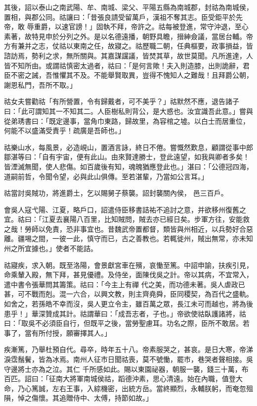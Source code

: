 \begin{pinyinscope}
 其後，詔以泰山之南武陽、牟、南城、梁父、平陽五縣為南城郡，封祜為南城侯，置相，與郡公同。祜讓曰：「昔張良請受留萬戶，漢祖不奪其志。臣受鉅平於先帝，敢
 辱重爵，以速官謗！」固執不拜，帝許之。祜每被登進，常守沖退，至心素著，故特見申於分列之外。是以名德遠播，朝野具瞻，搢紳僉議，當居台輔。帝方有兼并之志，仗祜以東南之任，故寢之。祜歷職二朝，任典樞要，政事損益，皆諮訪焉，勢利之求，無所關與。其嘉謀讜議，皆焚其草，故世莫聞。凡所進達，人皆不知所由。或謂祜慎密太過者，祜曰：「是何言歟！夫入則造膝，出則詭辭，君臣不密之誡，吾惟懼其不及。不能舉賢取異，豈得不愧知人之難哉！且拜爵公朝，謝恩私門，吾所不取。」



 祜女夫嘗勸祜「有所營置，令有歸戴者，可不美乎？」祜默然不應，退告諸子
 曰：「此可謂知其一不知其二。人臣樹私則背公，是大惑也。汝宜識吾此意。」嘗與從弟琇書曰：「既定邊事，當角巾東路，歸故里，為容棺之墟。以白士而居重位，何能不以盛滿受責乎！疏廣是吾師也。」



 祜樂山水，每風景，必造峴山，置酒言詠，終日不倦。嘗慨然歎息，顧謂從事中郎鄒湛等曰：「自有宇宙，便有此山。由來賢達勝士，登此遠望，如我與卿者多矣！皆湮滅無聞，使人悲傷。如百歲後有知，魂魄猶應登此也。」湛曰：「公德冠四海，道嗣前哲，令聞令望，必與此山俱傳。至若湛輩，乃當如公言耳。」



 祜當討吳賊功，將進爵土，乞以賜舅子蔡襲。詔封襲關內侯，
 邑三百戶。



 會吳人寇弋陽、江夏，略戶口，詔遣侍臣移書詰祐不追討之意，并欲移州復舊之宜。祜曰：「江夏去襄陽八百里，比知賊問，賊去亦已經日矣。步軍方往，安能救之哉！勞師以免責，恐非事宜也。昔魏武帝置都督，類皆與州相近，以兵勢好合惡離。疆埸之間，一彼一此，慎守而已，古之善教也。若輒徙州，賊出無常，亦未知州之所宜據也。」使者不能詰。



 祜寢疾，求入朝。既至洛陽，會景獻宮車在殯，哀慟至篤。中詔申諭，扶疾引見，命乘輦入殿，無下拜，甚見優禮。及侍坐，面陳伐吳之計。帝以其病，不宜常入，遣中書令張華問其籌策。祜曰：「今主上有禪
 代之美，而功德未著。吳人虐政已甚，可不戰而剋。混一六合，以興文教，則主齊堯舜，臣同稷契，為百代之盛軌。如舍之，若孫皓不幸而沒，吳人更立令主，雖百萬之眾，長江未可而越也，將為後患乎！」華深贊成其計。祜謂華曰：「成吾志者，子也。」帝欲使祜臥護諸將，祜曰：「取吳不必須臣自行，但既平之後，當勞聖慮耳。功名之際，臣所不敢居。若事了，當有所付授，願審擇其人。」



 疾漸篤，乃舉杜預自代。尋卒，時年五十八。帝素服哭之，甚哀。是日大寒，帝涕淚霑鬚鬢，皆為冰焉。南州人征市日聞祜喪，莫不號慟，罷市，巷哭者聲相接。吳守邊將士亦為之泣。其仁
 千所感如此。賜以東園祕器，朝服一襲，錢三十萬，布百匹。詔曰：「征南大將軍南城侯祜，蹈德沖素，思心清遠。始在內職，值登大命，乃心篤誠，左右王事，入綜機密，出統方岳。當終顯烈，永輔朕躬，而奄忽殂隕，悼之傷懷。其追贈侍中、太傅，持節如故。」




\end{pinyinscope}
